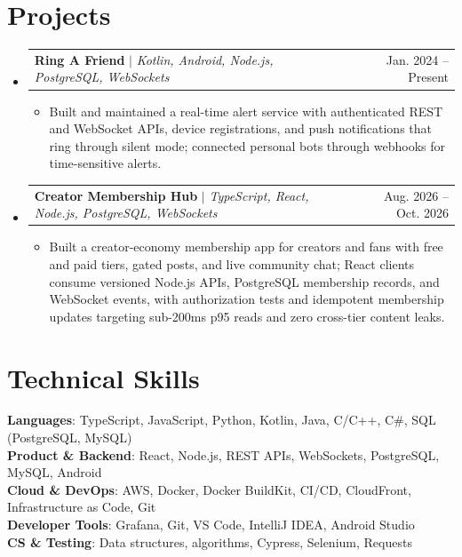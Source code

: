 \documentclass[letterpaper,11pt]{article}
\makeatletter
\newcommand{\resumeItem}[1]{
  \item\small{
    {#1 \vspace{-2pt}}
  }
}
\newcommand{\resumeProjectHeading}[2]{
    \item
    \begin{tabular*}{0.97\textwidth}{l@{\extracolsep{\fill}}r}
      \small#1 & #2 \\
    \end{tabular*}\vspace{-7pt}
}
\newcommand{\resumeSubHeadingListStart}{\begin{itemize}[leftmargin=0.15in, label={}]}
\newcommand{\resumeSubHeadingListEnd}{\end{itemize}}
\newcommand{\resumeItemListStart}{\begin{itemize}}
\newcommand{\resumeItemListEnd}{\end{itemize}\vspace{-5pt}}
\makeatother
\begin{document}
\section{Projects}
\resumeSubHeadingListStart
\resumeProjectHeading
{\textbf{Ring A Friend} $|$ \emph{Kotlin, Android, Node.js, PostgreSQL, WebSockets}}{Jan. 2024 -- Present}
\resumeItemListStart
\resumeItem{Built and maintained a real-time alert service with authenticated REST and WebSocket APIs, device registrations, and push notifications that ring through silent mode; connected personal bots through webhooks for time-sensitive alerts.}
\resumeItemListEnd
\resumeProjectHeading
{\textbf{Creator Membership Hub} $|$ \emph{TypeScript, React, Node.js, PostgreSQL, WebSockets}}{Aug. 2026 -- Oct. 2026}
\resumeItemListStart
\resumeItem{Built a creator-economy membership app for creators and fans with free and paid tiers, gated posts, and live community chat; React clients consume versioned Node.js APIs, PostgreSQL membership records, and WebSocket events, with authorization tests and idempotent membership updates targeting sub-200ms p95 reads and zero cross-tier content leaks.}
\resumeItemListEnd
\resumeSubHeadingListEnd


\section{Technical Skills}
\begin{itemize}[leftmargin=0.15in, label={}]
  \small{\item{
        \textbf{Languages}{: TypeScript, JavaScript, Python, Kotlin, Java, C/C++, C\#, SQL (PostgreSQL, MySQL)} \\
        \textbf{Product \& Backend}{: React, Node.js, REST APIs, WebSockets, PostgreSQL, MySQL, Android} \\
        \textbf{Cloud \& DevOps}{: AWS, Docker, Docker BuildKit, CI/CD, CloudFront, Infrastructure as Code, Git} \\
        \textbf{Developer Tools}{: Grafana, Git, VS Code, IntelliJ IDEA, Android Studio} \\
        \textbf{CS \& Testing}{: Data structures, algorithms, Cypress, Selenium, Requests}
        }}
\end{itemize}


\end{document}
